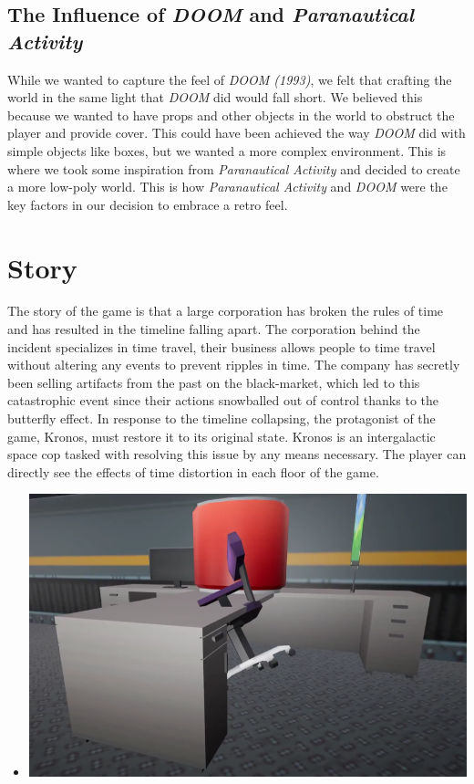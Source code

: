 \documentclass{sigchi}
\begin{document}
\subsection{The Influence of \textit{DOOM} and \textit{Paranautical Activity}}
While we wanted to capture the feel of \textit{DOOM (1993)}, we felt that crafting the world in the same light that \textit{DOOM} did would fall short. We believed this because we wanted to have props and other objects in the world to obstruct the player and provide cover. This could have been achieved the way \textit{DOOM} did with simple objects like boxes, but we wanted a more complex environment. This is where we took some inspiration from \textit{Paranautical Activity} and decided to create a more low-poly world. This is how \textit{Paranautical Activity} and \textit{DOOM} were the key factors in our decision to embrace a retro feel.

\section{Story}
The story of the game is that a large corporation has broken the rules of time and has resulted in the timeline falling apart. The corporation behind the incident specializes in time travel, their business allows people to time travel without altering any events to prevent ripples in time. The company has secretly been selling artifacts from the past on the black-market, which led to this catastrophic event since their actions snowballed out of control thanks to the butterfly effect. In response to the timeline collapsing, the protagonist of the game, Kronos, must restore it to its original state. Kronos is an intergalactic space cop tasked with resolving this issue by any means necessary. The player can directly see the effects of time distortion in each floor of the game.
\begin{itemize}
	\item [] {
		\centering
		\includegraphics[scale=0.4]{timeMessedUp.png}
	}
\end{itemize}
\end{document}
